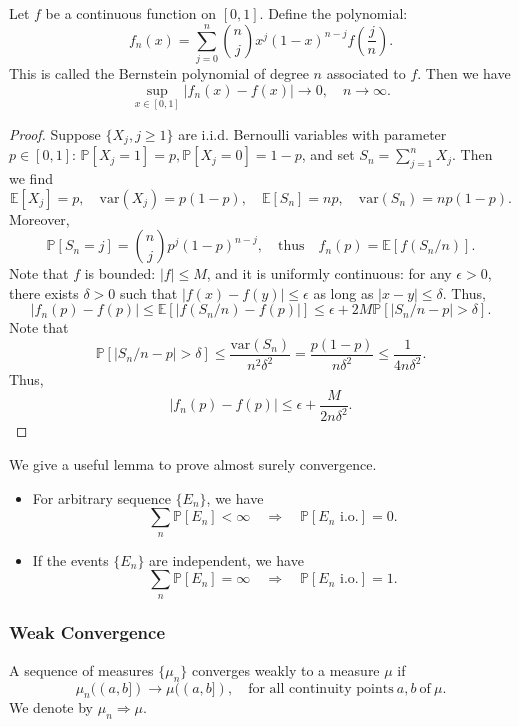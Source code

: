 \begin{exam}
    Let \( f \) be a continuous function on \( [0, 1] \). Define the polynomial:
\[
f_n(x) = \sum_{j=0}^{n} \binom{n}{j} x^j (1 - x)^{n - j} f\left( \frac{j}{n} \right).
\]
This is called the Bernstein polynomial of degree \( n \) associated to \( f \). Then we have
\[
\sup_{x \in [0, 1]} |f_n(x) - f(x)| \to 0, \quad n \to \infty.
\]
\end{exam}

\begin{proof}
    Suppose \( \{ X_j, j \geq 1 \} \) are i.i.d. Bernoulli variables with parameter \( p \in [0, 1] \): \( \mathbb{P}[X_j = 1] = p, \mathbb{P}[X_j = 0] = 1 - p \), and set \( S_n = \sum_{j=1}^{n} X_j \). Then we find
\[
\mathbb{E}[X_j] = p, \quad \text{var}(X_j) = p(1 - p), \quad \mathbb{E}[S_n] = np, \quad \text{var}(S_n) = np(1 - p).
\]
Moreover, 
\[
\mathbb{P}[S_n = j] = \binom{n}{j} p^j (1 - p)^{n - j}, \quad \text{thus} \quad f_n(p) = \mathbb{E}[f(S_n/n)].
\]
Note that \( f \) is bounded: \( |f| \leq M \), and it is uniformly continuous: for any \( \epsilon > 0 \), there exists \( \delta > 0 \) such that \( |f(x) - f(y)| \leq \epsilon \) as long as \( |x - y| \leq \delta \). Thus,
\[
|f_n(p) - f(p)| \leq \mathbb{E}[|f(S_n/n) - f(p)|] \leq \epsilon + 2M \mathbb{P}[|S_n/n - p| > \delta].
\]
Note that
\[
\mathbb{P}[|S_n/n - p| > \delta] \leq \frac{\text{var}(S_n)}{n^2 \delta^2} = \frac{p(1 - p)}{n \delta^2} \leq \frac{1}{4n \delta^2}.
\]
Thus,
\[
|f_n(p) - f(p)| \leq \epsilon + \frac{M}{2n \delta^2}.
\]
\end{proof}

We give a useful lemma to prove almost surely convergence.
\begin{thm}
\label{BC_lemma}
\begin{itemize}
    \item For arbitrary sequence \( \{ E_n \} \), we have
    \[
    \sum_n \mathbb{P}[E_n] < \infty \quad \Rightarrow \quad \mathbb{P}[E_n \text{ i.o.}] = 0.
    \]
    \item If the events \( \{ E_n \} \) are independent, we have
    \[
    \sum_n \mathbb{P}[E_n] = \infty \quad \Rightarrow \quad \mathbb{P}[E_n \text{ i.o.}] = 1.
    \]
\end{itemize}
\end{thm}

\subsubsection{Weak Convergence}
\begin{defn}
    A sequence of measures \( \{ \mu_n \} \) converges weakly to a measure \( \mu \) if
    \[
    \mu_n((a, b]) \to \mu((a, b]), \quad \text{for all continuity points} \ a, b \ \text{of} \ \mu.
    \]
    We denote by \( \mu_n \Rightarrow \mu \).
\end{defn}

